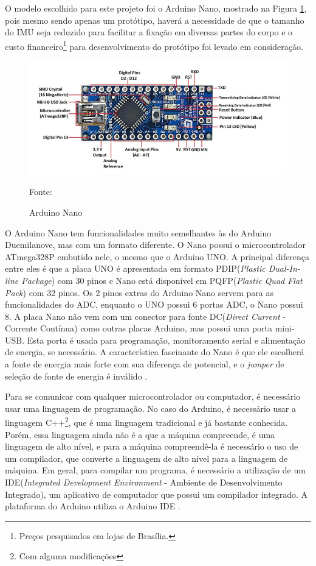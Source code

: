 O  modelo escolhido para este projeto foi o Arduino Nano, mostrado na Figura \ref{arduino}, pois mesmo sendo apenas um protótipo, haverá a necessidade de que o tamanho do IMU seja reduzido para facilitar a fixação em diversas partes do corpo e o custo financeiro\footnote{Preços pesquisados em lojas de Brasília.} para desenvolvimento do protótipo foi levado em consideração.

\begin{figure}[h]
	\centering
	\includegraphics[keepaspectratio=true,scale=0.7
	]{figuras/arduino_nano.png}
	\caption{ Arduino Nano }
	Fonte: \cite{john2018}
	\label{arduino}	
\end{figure}


O Arduino Nano tem funcionalidades muito semelhantes às do Arduino Duemilanove, mas com um formato diferente. O Nano possui o microcontrolador ATmega328P embutido nele, o mesmo que o Arduino UNO. A principal diferença entre eles é que a placa UNO é apresentada em formato PDIP(\textit{Plastic Dual-In-line Package}) com 30 pinos e Nano está disponível em PQFP(\textit{Plastic Quad Flat Pack}) com 32 pinos. Os 2 pinos extras do Arduino Nano servem para as funcionalidades do ADC, enquanto o UNO possui 6 portas ADC, o Nano possui 8. A placa Nano não vem com um conector para fonte DC(\textit{Direct Current} - Corrente Contínua) como outras placas Arduino, mas possui uma porta mini-USB. Esta porta é usada para programação, monitoramento serial e alimentação de energia, se necessário. A característica fascinante do Nano é que ele escolherá a fonte de energia mais forte com sua diferença de potencial, e o \textit{jumper} de seleção de fonte de energia é inválido \cite{john2018}.  

Para se comunicar com qualquer microcontrolador ou computador, é necessário usar uma linguagem de programação. No caso do Arduino, é necessário usar a linguagem C++\footnote{Com alguma modificações}, que é uma linguagem tradicional e já bastante conhecida. Porém, essa linguagem ainda não é a que a máquina compreende, é uma linguagem de alto nível, e para a máquina compreendê-la é necessário o uso de um compilador, que converte a linguagem de alto nível para a linguagem de máquina. Em geral, para compilar um programa, é necessário a utilização de um IDE(\textit{Integrated Development Environment} - Ambiente de Desenvolvimento Integrado), um aplicativo de computador que possui um compilador integrado. A plataforma do Arduino utiliza o Arduino IDE \cite{chavier2016}. 


